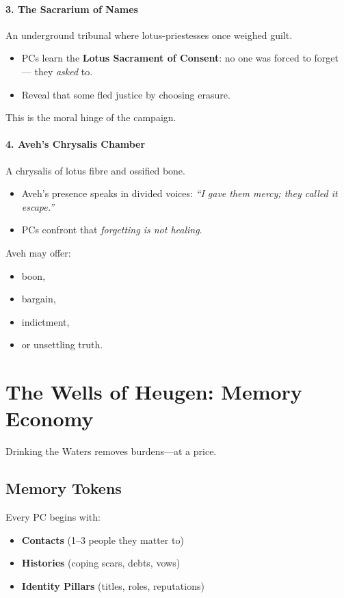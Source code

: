 \documentclass[11pt]{article}
\begin{document}
\paragraph{3. The Sacrarium of Names}
An underground tribunal where lotus-priestesses once weighed guilt.

\begin{itemize}[leftmargin=*]
  \item PCs learn the \textbf{Lotus Sacrament of Consent}:
    no one was forced to forget --- they \emph{asked} to.
  \item Reveal that some fled justice by choosing erasure.
\end{itemize}

This is the moral hinge of the campaign.

\paragraph{4. Aveh's Chrysalis Chamber}
A chrysalis of lotus fibre and ossified bone.

\begin{itemize}[leftmargin=*]
  \item Aveh's presence speaks in divided voices:
    \emph{``I gave them mercy; they called it escape.''}
  \item PCs confront that \emph{forgetting is not healing}.
\end{itemize}

Aveh may offer:
\begin{itemize}[leftmargin=*]
  \item boon,
  \item bargain,
  \item indictment,
  \item or unsettling truth.
\end{itemize}

\bigskip

\section*{The Wells of Heugen: Memory Economy}


Drinking the Waters removes burdens---at a price.

\subsection*{Memory Tokens}
Every PC begins with:
\begin{itemize}
  \item \textbf{Contacts} (1--3 people they matter to)
  \item \textbf{Histories} (coping scars, debts, vows)
  \item \textbf{Identity Pillars} (titles, roles, reputations)
\end{itemize}
\end{document}
